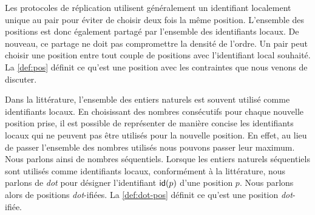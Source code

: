 \medskip

Les protocoles de réplication utilisent généralement un identifiant localement unique au pair pour éviter de choisir deux fois la même position.
L'ensemble des positions est donc également partagé par l'ensemble des identifiants locaux.
De nouveau, ce partage ne doit pas compromettre la densité de l'ordre.
Un pair peut choisir une position entre tout couple de positions avec l'identifiant local souhaité.
La \autoref{def:pos} définit ce qu'est une position avec les contraintes que nous venons de discuter.

\medskip

Dans la littérature, l'ensemble des entiers naturels est souvent utilisé comme identifiants locaux.
En choisissant des nombres consécutifs pour chaque nouvelle position prise, il est possible de représenter de manière concise les identifiants locaux qui ne peuvent pas être utilisés pour la nouvelle position.
En effet, au lieu de passer l'ensemble des nombres utilisés nous pouvons passer leur maximum.
Nous parlons ainsi de nombres séquentiels.
Lorsque les entiers naturels séquentiels sont utilisés comme identifiants locaux, conformément à la littérature, nous parlons de \emph{dot} pour désigner l'identifiant $\operatorname{\mathsf{id}}(p)$ d'une position $p$.
Nous parlons alors de positions \emph{dot}-ifiées.
La \autoref{def:dot-pos} définit ce qu'est une position \emph{dot}-ifiée.


